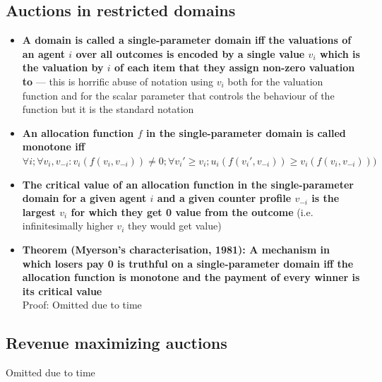 \documentclass[20pt,a4paper,landscape]{extarticle}
\begin{document}
\begin{flushleft}
\subsection{Auctions in restricted domains}
\begin{itemize}
\item \textbf{A domain is called a single-parameter domain iff the valuations of an agent \boldmath$i$ over all outcomes is encoded by a single value $v_i$ which is the valuation by $i$ of each item that they assign non-zero valuation to} --- this is horrific abuse of notation using $v_i$ both for the valuation function and for the scalar parameter that controls the behaviour of the function but it is the standard notation
\item \textbf{An allocation function \boldmath$f$ in the single-parameter domain is called monotone iff $\forall i; \forall v_i, v_{-i}: v_i(f(v_i, v_{-i})) \neq 0; \allowbreak\forall v_i' \geq v_i; u_i(f(v_i', v_{-i})) \geq v_i(f(v_i, v_{-i})))$}
\item \textbf{The critical value of an allocation function in the single-parameter domain  for a given agent $i$ and a given counter profile $v_{-i}$  is the largest $v_i$ for which they get 0 value from the outcome} (i.e. infinitesimally higher $v_i$ they would get value)
\item \textbf{Theorem (Myerson's characterisation, 1981): A mechanism in which losers pay 0 is truthful on a single-parameter domain iff the allocation function is monotone and the payment of every winner is its critical value}\\
Proof: Omitted due to time
\end{itemize}
\subsection{Revenue maximizing auctions}
Omitted due to time
\end{flushleft}
\end{document}
